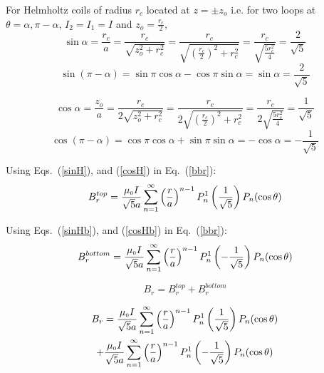 For Helmholtz coils of radius \(r_c\) located at \(z=\pm z_o\) i.e. for two loops at \(\theta=\alpha, \pi-\alpha \), \(I_2=I_1=I\) and \(z_o=\frac{r_c}{2}\),
\begin{equation}\label{sinH}
\sin\alpha=\frac{r_c}{a}=\frac{r_c}{\sqrt{z_o^2+r_c^2}}=\frac{r_c}{\sqrt{\left(\frac{r_c}{2}\right)^2+r_c^2}}=\frac{r_c}{\sqrt{\frac{5r_c^2}{4}}}=\frac{2}{\sqrt{5}}
\end{equation}
\begin{equation}\label{sinHb}
\sin(\pi-\alpha)=\sin\pi\cos\alpha-\cos\pi\sin\alpha=\sin\alpha=\frac{2}{\sqrt{5}}
\end{equation}

\begin{equation}\label{cosH}
\cos\alpha=\frac{z_o}{a}=\frac{r_c}{2\sqrt{z_o^2+r_c^2}}=\frac{r_c}{2\sqrt{\left(\frac{r_c}{2}\right)^2+r_c^2}}=\frac{r_c}{2\sqrt{\frac{5r_c^2}{4}}}=\frac{1}{\sqrt{5}}
\end{equation}
\begin{equation}\label{cosHb}
\cos(\pi-\alpha)=\cos\pi\cos\alpha+\sin\pi\sin\alpha=-\cos\alpha=-\frac{1}{\sqrt{5}}
\end{equation}


Using Eqs.~(\ref{sinH}), and (\ref{cosH}) in Eq.~(\ref{bbr}):
\begin{equation}\label{bbrH}
B_r^{top}=\frac{\mu_{\scriptscriptstyle 0} I }{\sqrt{5}a}\sum_{n=1}^{\infty} \left(\frac{r}{a}\right)^{n-1}P_n^1\left(\frac{1}{\sqrt{5}}\right) P_n(\cos\theta)
\end{equation}

Using Eqs.~(\ref{sinHb}), and (\ref{cosHb}) in Eq.~(\ref{bbr}):
\begin{equation}\label{bbrHb}
B_r^{bottom}=\frac{\mu_{\scriptscriptstyle 0} I }{\sqrt{5}a}\sum_{n=1}^{\infty} \left(\frac{r}{a}\right)^{n-1}P_n^1\left(-\frac{1}{\sqrt{5}}\right) P_n(\cos\theta)
\end{equation}

\begin{equation}\label{brtot}
B_r=B_r^{top}+B_r^{bottom}
\end{equation}

\begin{multline}\label{brtot_1}
    B_r=\frac{\mu_{\scriptscriptstyle 0} I }{\sqrt{5}a}\sum_{n=1}^{\infty} \left(\frac{r}{a}\right)^{n-1}P_n^1\left(\frac{1}{\sqrt{5}}\right) P_n(\cos\theta) \\+\frac{\mu_{\scriptscriptstyle 0} I }{\sqrt{5}a}\sum_{n=1}^{\infty} \left(\frac{r}{a}\right)^{n-1}P_n^1\left(-\frac{1}{\sqrt{5}}\right) P_n(\cos\theta)
\end{multline}


